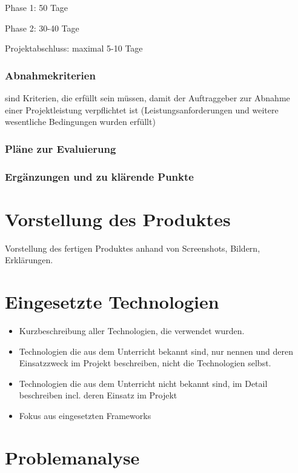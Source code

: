 Phase 1: 50 Tage

Phase 2: 30-40 Tage

Projektabschluss: maximal 5-10 Tage

\subsection{Abnahmekriterien}

sind Kriterien, die erfüllt sein müssen, damit der Auftraggeber zur Abnahme einer Projektleistung verpflichtet ist (Leistungsanforderungen und weitere wesentliche Bedingungen wurden erfüllt)
\subsection{Pläne zur Evaluierung}
\subsection{Ergänzungen und zu klärende Punkte}

\chapter{Vorstellung des Produktes}
Vorstellung des fertigen Produktes anhand von Screenshots, Bildern, Erklärungen.

\chapter{Eingesetzte Technologien}
\begin{itemize}
	\item Kurzbeschreibung aller Technologien, die verwendet wurden.
	\item Technologien die aus dem Unterricht bekannt sind, nur nennen und deren  Einsatzzweck im Projekt beschreiben, nicht die Technologien selbst.
	\item Technologien die aus dem Unterricht nicht bekannt sind, im Detail beschreiben incl. deren Einsatz im Projekt
	\item Fokus aus eingesetzten Frameworks
\end{itemize}

\chapter{Problemanalyse}

